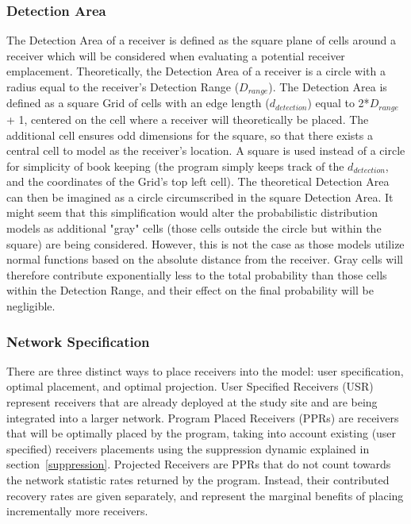 \subsubsection{Detection Area}
\label{detectionArea}
The Detection Area of a receiver is defined as the square plane of cells around a receiver which will be considered when evaluating a potential receiver emplacement.  Theoretically, the Detection Area of a receiver is a circle with a radius equal to the receiver's Detection Range ($D_{range}$).  The Detection Area is defined as a square Grid of cells with an edge length ($d_{detection}$) equal to 2*$D_{range}$ + 1, centered on the cell where a receiver will theoretically be placed.  The additional cell ensures odd dimensions for the square, so that there exists a central cell to model as the receiver's location. A square is used instead of a circle for simplicity of book keeping (the program simply keeps track of the $d_{detection}$, and the coordinates of the Grid's top left cell).  The theoretical Detection Area can then be imagined as a circle circumscribed in the square Detection Area.  It might seem that this simplification would alter the probabilistic distribution models as additional "gray" cells (those cells outside the circle but within the square) are being considered.  However, this is not the case as those models utilize normal functions based on the absolute distance from the receiver.  Gray cells will therefore contribute exponentially less to the total probability than those cells within the Detection Range, and their effect on the final probability will be negligible.  

\subsubsection{Network Specification}
There are three distinct ways to place receivers into the model: user specification, optimal placement, and optimal projection.  User Specified Receivers (USR) represent receivers that are already deployed at the study site and are being integrated into a larger network.    Program Placed Receivers (PPRs) are receivers that will be  optimally placed by the program, taking into account existing (user specified) receivers placements using the suppression dynamic explained in section~\ref{suppression}.  Projected Receivers are PPRs that do not count towards the network statistic rates returned by the program.  Instead, their contributed recovery rates are given separately, and represent the marginal benefits of placing incrementally more receivers.  


